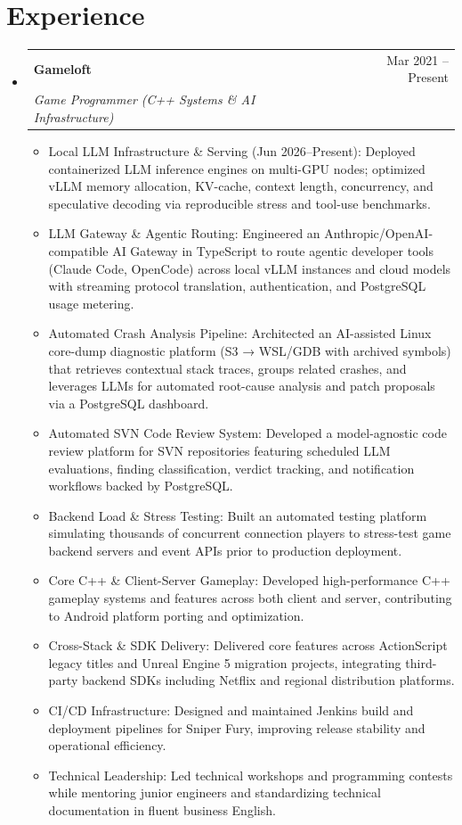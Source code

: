 \documentclass[letterpaper,10pt]{article}
\makeatletter
\newcommand{\resumeItem}[1]{
  \item\small{
    {#1 \vspace{-2pt}}
  }
}
\newcommand{\resumeSubheading}[4]{
  \vspace{1pt}\item
    \begin{tabular*}{0.97\textwidth}[t]{l@{\extracolsep{\fill}}r}
      \textbf{#1} & #2 \\
      \textit{\small#3} & \textit{\small #4} \\
    \end{tabular*}\vspace{-2pt}
}
\newcommand{\resumeSubHeadingListStart}{\begin{itemize}[leftmargin=0.15in, label={}, itemsep=2pt]}
\newcommand{\resumeSubHeadingListEnd}{\end{itemize}\vspace{2pt}}
\newcommand{\resumeItemListStart}{\begin{itemize}[itemsep=3pt, parsep=2pt, topsep=3pt]}
\newcommand{\resumeItemListEnd}{\end{itemize}\vspace{2pt}}
\makeatother
\begin{document}
\section{Experience}
  \resumeSubHeadingListStart
    \resumeSubheading
      {Gameloft}{Mar 2021 -- Present}
      {Game Programmer (C++ Systems \& AI Infrastructure)}{}
      \resumeItemListStart
                \resumeItem{Local LLM Infrastructure \& Serving (Jun 2026–Present): Deployed containerized LLM inference engines on multi-GPU nodes; optimized vLLM memory allocation, KV-cache, context length, concurrency, and speculative decoding via reproducible stress and tool-use benchmarks.}
        \resumeItem{LLM Gateway \& Agentic Routing: Engineered an Anthropic/OpenAI-compatible AI Gateway in TypeScript to route agentic developer tools (Claude Code, OpenCode) across local vLLM instances and cloud models with streaming protocol translation, authentication, and PostgreSQL usage metering.}
        \resumeItem{Automated Crash Analysis Pipeline: Architected an AI-assisted Linux core-dump diagnostic platform (S3 → WSL/GDB with archived symbols) that retrieves contextual stack traces, groups related crashes, and leverages LLMs for automated root-cause analysis and patch proposals via a PostgreSQL dashboard.}
        \resumeItem{Automated SVN Code Review System: Developed a model-agnostic code review platform for SVN repositories featuring scheduled LLM evaluations, finding classification, verdict tracking, and notification workflows backed by PostgreSQL.}
        \resumeItem{Backend Load \& Stress Testing: Built an automated testing platform simulating thousands of concurrent connection players to stress-test game backend servers and event APIs prior to production deployment.}
        \resumeItem{Core C++ \& Client-Server Gameplay: Developed high-performance C++ gameplay systems and features across both client and server, contributing to Android platform porting and optimization.}
        \resumeItem{Cross-Stack \& SDK Delivery: Delivered core features across ActionScript legacy titles and Unreal Engine 5 migration projects, integrating third-party backend SDKs including Netflix and regional distribution platforms.}
        \resumeItem{CI/CD Infrastructure: Designed and maintained Jenkins build and deployment pipelines for Sniper Fury, improving release stability and operational efficiency.}
        \resumeItem{Technical Leadership: Led technical workshops and programming contests while mentoring junior engineers and standardizing technical documentation in fluent business English.}
      \resumeItemListEnd
  \resumeSubHeadingListEnd
\end{document}
